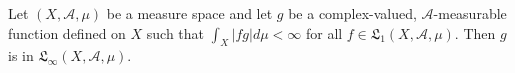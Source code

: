 Let $(X, \mathcal{A}, \mu)$ be a measure space and let $g$ be a complex-valued, $\mathcal{A}$-measurable function defined on $X$ such that $\int_X |f g| d\mu < \infty$ for all $f \in \mathfrak{L}_1(X, \mathcal{A}, \mu)$. Then $g$ is in $\mathfrak{L}_{\infty}(X, \mathcal{A}, \mu)$.
